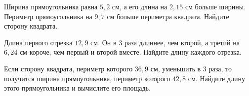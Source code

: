 \begin{class}[number=3]
\begin{listofex}
		\item Ширина прямоугольника равна \( 5,2 \) см, а его длина на \( 2,15 \) см больше ширины. Периметр прямоугольника на \( 9,7 \) см больше периметра квадрата. Найдите сторону квадрата.
		\item Длина первого отрезка \( 12,9 \) см. Он в \( 3 \) раза длиннее, чем второй, а третий на \( 6,24 \) см короче, чем первый и второй вместе. Найдите длину каждого отрезка.
		\item Если сторону квадрата, периметр которого \( 36,9 \) см, уменьшить в 3 раза, то получится ширина прямоугольника, периметр которого \( 42,8 \) см. Найдите длину этого прямоугольника и вычислите его площадь.
	\end{listofex}
\end{class}

